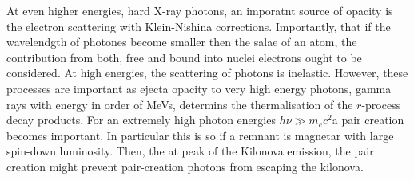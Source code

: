 At even higher energies, hard X-ray photons, an imporatnt source of opacity is the electron scattering with Klein-Nishina corrections. Importantly, that if the wavelendgth of photones become smaller then the salae of an atom, the contribution from both, free and bound into nuclei electrons ought to be considered. At high energies, the scattering of photons is inelastic. However, these processes are important as ejecta opacity to very high energy photons, gamma rays with energy in order of MeVs, determins the thermalisation of the $r$-process decay products.
For an extremely high photon energies $h\nu \gg m_e c^2$a pair creation becomes important. In particular this is so if a remnant is magnetar with large spin-down luminosity. Then, the at peak of the Kilonova emission, the pair creation might prevent pair-creation photons from escaping the kilonova. 

